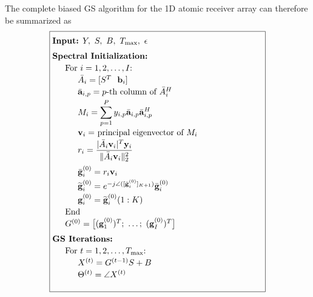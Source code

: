 \documentclass[12pt,a4paper]{article}
\begin{document}
The complete biased GS algorithm for the 1D atomic receiver array can
therefore be summarized as
\begin{equation}
\fbox{%
\begin{minipage}{0.72\linewidth}
\vspace{4pt}
\textbf{Input:} $Y,\ S,\ B,\ T_{\max},\ \epsilon$\\[6pt]
\textbf{Spectral Initialization:}\\[2pt]
\hspace*{1.5em}For $i=1,2,\ldots,I$:\\[2pt]
\hspace*{3em}$\bar A_i=[S^T\ \ \mathbf b_i]$\\[2pt]
\hspace*{3em}$\bar{\mathbf a}_{i,p}=p$-th column of $\bar A_i^H$\\[2pt]
\hspace*{3em}$M_i=\displaystyle\sum_{p=1}^{P}y_{i,p}\bar{\mathbf a}_{i,p}\bar{\mathbf a}_{i,p}^H$\\[2pt]
\hspace*{3em}$\mathbf v_i=$ principal eigenvector of $M_i$\\[2pt]
\hspace*{3em}$r_i=\dfrac{|\bar A_i\mathbf v_i|^T\mathbf y_i}{\|\bar A_i\mathbf v_i\|_2^2}$\\[4pt]
\hspace*{3em}$\bar{\mathbf g}_i^{(0)}=r_i\mathbf v_i$\\[2pt]
\hspace*{3em}$\widetilde{\mathbf g}_i^{(0)}=e^{-j\angle([\bar{\mathbf g}_i^{(0)}]_{K+1})}\bar{\mathbf g}_i^{(0)}$\\[2pt]
\hspace*{3em}$\mathbf g_i^{(0)}=\widetilde{\mathbf g}_i^{(0)}(1:K)$\\[2pt]
\hspace*{1.5em}End\\[2pt]
\hspace*{1.5em}$G^{(0)}=\big[(\mathbf g_1^{(0)})^T;\ \ldots;\ (\mathbf g_I^{(0)})^T\big]$\\[6pt]
\textbf{GS Iterations:}\\[2pt]
\hspace*{1.5em}For $t=1,2,\ldots,T_{\max}$:\\[2pt]
\hspace*{3em}$X^{(t)}=G^{(t-1)}S+B$\\[2pt]
\hspace*{3em}$\Theta^{(t)}=\angle X^{(t)}$\\[2pt]

\end{minipage}}
\end{equation}
\end{document}
